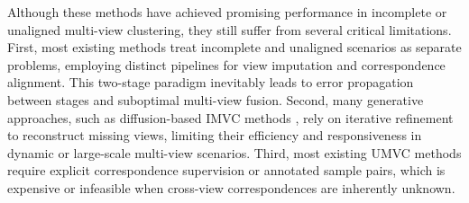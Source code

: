 \documentclass{article}
\theoremstyle{plain}
\theoremstyle{definition}
\theoremstyle{remark}
\begin{document}
Although these methods have achieved promising performance in incomplete or unaligned multi-view clustering, they still suffer from several critical limitations. First, most existing methods treat incomplete and unaligned scenarios as separate problems, employing distinct pipelines for view imputation and correspondence alignment. This two-stage paradigm inevitably leads to error propagation between stages and suboptimal multi-view fusion. Second, many generative approaches, such as diffusion-based IMVC methods \cite{zhangIncompleteMultiviewClustering2025a}, rely on iterative refinement to reconstruct missing views, limiting their efficiency and responsiveness in dynamic or large-scale multi-view scenarios.%
Third, most existing UMVC methods \cite{huangPartiallyViewalignedClustering2020a,xinMultilevelReliableGuidance2025} require explicit correspondence supervision or annotated sample pairs, which is expensive or infeasible when cross-view correspondences are inherently unknown. 
\end{document}
